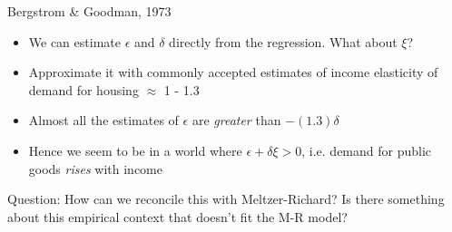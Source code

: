 \documentclass[aspectratio=169]{beamer}
\begin{document}
\begin{frame}{Bergstrom \& Goodman, 1973}

\begin{itemize}
\item We can estimate $\epsilon$ and $\delta$ directly from the regression. What about $\xi$?
\pause 
\item Approximate it with commonly accepted estimates of income elasticity of demand for housing $\approx$ 1 - 1.3
\pause 
\item Almost all the estimates of $\epsilon$ are \textit{greater} than $-(1.3) \delta$
\pause
\item Hence we seem to be in a world where $\epsilon + \delta \xi > 0$, i.e. demand for public goods \textit{rises} with income
\end{itemize}

\begin{tcolorbox} \alert{Question}: How can we reconcile this with Meltzer-Richard? Is there something about this empirical context that doesn't fit the M-R model?
\end{tcolorbox}


\end{frame}
\end{document}
